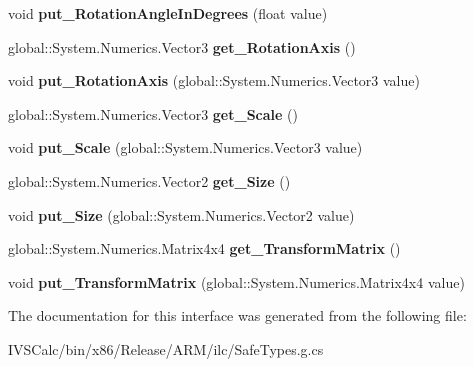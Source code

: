 \begin{DoxyCompactItemize}
\item 
\mbox{\label{interface_windows_1_1_u_i_1_1_composition_1_1_i_visual_ab9d2508241cebf4d3bbc2b46c988a77d}} 
void {\bfseries put\+\_\+\+Rotation\+Angle\+In\+Degrees} (float value)
\item 
\mbox{\label{interface_windows_1_1_u_i_1_1_composition_1_1_i_visual_a0fd647734a3c87cddfea98310e1b7406}} 
global\+::\+System.\+Numerics.\+Vector3 {\bfseries get\+\_\+\+Rotation\+Axis} ()
\item 
\mbox{\label{interface_windows_1_1_u_i_1_1_composition_1_1_i_visual_adc180a8a094a1c17218d366727de39d4}} 
void {\bfseries put\+\_\+\+Rotation\+Axis} (global\+::\+System.\+Numerics.\+Vector3 value)
\item 
\mbox{\label{interface_windows_1_1_u_i_1_1_composition_1_1_i_visual_abbebc4f788f7f54a21dae7aff127d8c8}} 
global\+::\+System.\+Numerics.\+Vector3 {\bfseries get\+\_\+\+Scale} ()
\item 
\mbox{\label{interface_windows_1_1_u_i_1_1_composition_1_1_i_visual_a3b8c0e5a8bb5705d5f952699938353d2}} 
void {\bfseries put\+\_\+\+Scale} (global\+::\+System.\+Numerics.\+Vector3 value)
\item 
\mbox{\label{interface_windows_1_1_u_i_1_1_composition_1_1_i_visual_a4fd65ed5e372f54009fa859d80730483}} 
global\+::\+System.\+Numerics.\+Vector2 {\bfseries get\+\_\+\+Size} ()
\item 
\mbox{\label{interface_windows_1_1_u_i_1_1_composition_1_1_i_visual_a40381fd8b9d0a94c741b895b7e107cc7}} 
void {\bfseries put\+\_\+\+Size} (global\+::\+System.\+Numerics.\+Vector2 value)
\item 
\mbox{\label{interface_windows_1_1_u_i_1_1_composition_1_1_i_visual_ab7a1f90666dae73a006fb9ff5e2943fc}} 
global\+::\+System.\+Numerics.\+Matrix4x4 {\bfseries get\+\_\+\+Transform\+Matrix} ()
\item 
\mbox{\label{interface_windows_1_1_u_i_1_1_composition_1_1_i_visual_a74c1e3422a186d04eb48fb2921e293e4}} 
void {\bfseries put\+\_\+\+Transform\+Matrix} (global\+::\+System.\+Numerics.\+Matrix4x4 value)
\end{DoxyCompactItemize}


The documentation for this interface was generated from the following file\+:\begin{DoxyCompactItemize}
\item 
I\+V\+S\+Calc/bin/x86/\+Release/\+A\+R\+M/ilc/Safe\+Types.\+g.\+cs\end{DoxyCompactItemize}
